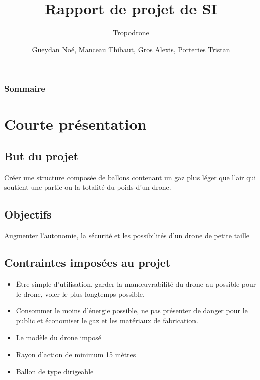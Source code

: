\documentclass{beamer}
\title{Rapport de projet de SI}
\subtitle{Tropodrone}
\author{Gueydan Noé, Manceau Thibaut, Gros Alexis, Porteries Tristan}
\begin{document}
\begin{frame}
  \titlepage
\end{frame}

\begin{frame}
    \frametitle{Sommaire}
    \begin{multicols}{2}
      {
		\setcounter{tocdepth}{1}
        \tableofcontents
      }
    \end{multicols}
\end{frame}

\section{Courte présentation}

\subsection{But du projet}

\begin{frame}
 Créer une structure composée de ballons contenant un gaz plus léger que l’air qui soutient une partie ou la totalité du poids d'un drone.
\end{frame}


\subsection{Objectifs}

\begin{frame}
 Augmenter l’autonomie, la sécurité et les possibilités d’un drone de petite taille
\end{frame}


\subsection{Contraintes imposées au projet}
\begin{frame}
  \begin{itemize}
    \item Être simple d’utilisation, garder la manœuvrabilité du drone au possible pour le drone, voler le plus longtemps possible.
    \item Consommer le moins d’énergie possible, ne pas présenter de danger pour le public et économiser le gaz et les matériaux de fabrication.
    \item Le modèle du drone imposé
    \item Rayon d’action de minimum 15 mètres
    \item Ballon de type dirigeable
  \end{itemize}
\end{frame}
\end{document}
